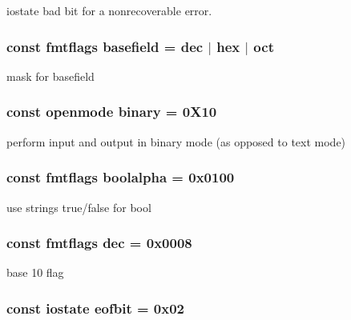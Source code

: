 iostate bad bit for a nonrecoverable error. \hypertarget{classios__base_a099df6dd825e552ca96669dd1be390c1}{
\subsubsection[{basefield}]{\setlength{\rightskip}{0pt plus 5cm}const {\bf fmtflags} basefield = {\bf dec} $|$ {\bf hex} $|$ {\bf oct}\hspace{0.3cm}{\ttfamily [static]}}}\label{classios__base_a099df6dd825e552ca96669dd1be390c1}
mask for basefield \hypertarget{classios__base_a5ebf69777b28b9c9fb3c4dbb42bf4159}{
\subsubsection[{binary}]{\setlength{\rightskip}{0pt plus 5cm}const {\bf openmode} binary = 0\-X10\hspace{0.3cm}{\ttfamily [static]}}}\label{classios__base_a5ebf69777b28b9c9fb3c4dbb42bf4159}
perform input and output in binary mode (as opposed to text mode) \hypertarget{classios__base_ac49277b4c54fa854d90ef9a45ca9806d}{
\subsubsection[{boolalpha}]{\setlength{\rightskip}{0pt plus 5cm}const {\bf fmtflags} boolalpha = 0x0100\hspace{0.3cm}{\ttfamily [static]}}}\label{classios__base_ac49277b4c54fa854d90ef9a45ca9806d}
use strings true/false for bool \hypertarget{classios__base_abb926294fefec12bd2215df50443d3ec}{
\subsubsection[{dec}]{\setlength{\rightskip}{0pt plus 5cm}const {\bf fmtflags} dec = 0x0008\hspace{0.3cm}{\ttfamily [static]}}}\label{classios__base_abb926294fefec12bd2215df50443d3ec}
base 10 flag \hypertarget{classios__base_a823ae086e75a9449cb485fbaaa47328f}{
\subsubsection[{eofbit}]{\setlength{\rightskip}{0pt plus 5cm}const {\bf iostate} eofbit = 0x02\hspace{0.3cm}{\ttfamily [static]}}}\label{classios__base_a823ae086e75a9449cb485fbaaa47328f}
